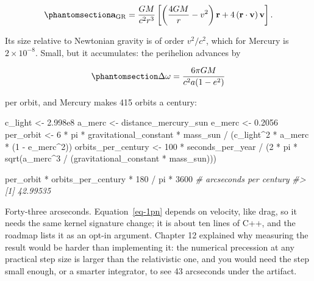 \documentclass[
  10.5pt,
  letterpaper,
]{scrbook}
\newenvironment{Shaded}{\begin{snugshade}}{\end{snugshade}}
\newcommand{\CommentTok}[1]{\textcolor[rgb]{0.00,0.00,0.00}{\textit{#1}}}
\newcommand{\DecValTok}[1]{\textcolor[rgb]{0.00,0.00,0.00}{#1}}
\newcommand{\FloatTok}[1]{\textcolor[rgb]{0.00,0.00,0.00}{#1}}
\newcommand{\FunctionTok}[1]{\textcolor[rgb]{0.00,0.00,0.00}{#1}}
\newcommand{\NormalTok}[1]{\textcolor[rgb]{0.00,0.00,0.00}{#1}}
\newcommand{\OtherTok}[1]{\textcolor[rgb]{0.00,0.00,0.00}{#1}}
\newcommand{\SpecialCharTok}[1]{\textcolor[rgb]{0.00,0.00,0.00}{#1}}
\theoremstyle{plain}
\theoremstyle{remark}
\begin{document}
\begin{equation}\protect\phantomsection\label{eq-1pn}{
\mathbf{a}_{\mathrm{GR}} = \frac{GM}{c^2 r^3}\left[\left(\frac{4GM}{r} - v^2\right)\mathbf{r} + 4\,(\mathbf{r}\cdot\mathbf{v})\,\mathbf{v}\right].
}\end{equation}

Its size relative to Newtonian gravity is of order \(v^2/c^2\), which
for Mercury is \(2\times10^{-8}\). Small, but it accumulates: the
perihelion advances by

\begin{equation}\protect\phantomsection\label{eq-gr-precession}{
\Delta\omega = \frac{6\pi GM}{c^2 a(1-e^2)}
}\end{equation}

per orbit, and Mercury makes 415 orbits a century:

\begin{Shaded}
\begin{Highlighting}[]
\NormalTok{c\_light }\OtherTok{\textless{}{-}} \FloatTok{2.998e8}
\NormalTok{a\_merc  }\OtherTok{\textless{}{-}}\NormalTok{ distance\_mercury\_sun}
\NormalTok{e\_merc  }\OtherTok{\textless{}{-}} \FloatTok{0.2056}
\NormalTok{per\_orbit }\OtherTok{\textless{}{-}} \DecValTok{6} \SpecialCharTok{*}\NormalTok{ pi }\SpecialCharTok{*}\NormalTok{ gravitational\_constant }\SpecialCharTok{*}\NormalTok{ mass\_sun }\SpecialCharTok{/}\NormalTok{ (c\_light}\SpecialCharTok{\^{}}\DecValTok{2} \SpecialCharTok{*}\NormalTok{ a\_merc }\SpecialCharTok{*}\NormalTok{ (}\DecValTok{1} \SpecialCharTok{{-}}\NormalTok{ e\_merc}\SpecialCharTok{\^{}}\DecValTok{2}\NormalTok{))}
\NormalTok{orbits\_per\_century }\OtherTok{\textless{}{-}} \DecValTok{100} \SpecialCharTok{*}\NormalTok{ seconds\_per\_year }\SpecialCharTok{/}\NormalTok{ (}\DecValTok{2} \SpecialCharTok{*}\NormalTok{ pi }\SpecialCharTok{*} \FunctionTok{sqrt}\NormalTok{(a\_merc}\SpecialCharTok{\^{}}\DecValTok{3} \SpecialCharTok{/}\NormalTok{ (gravitational\_constant }\SpecialCharTok{*}\NormalTok{ mass\_sun)))}

\NormalTok{per\_orbit }\SpecialCharTok{*}\NormalTok{ orbits\_per\_century }\SpecialCharTok{*} \DecValTok{180} \SpecialCharTok{/}\NormalTok{ pi }\SpecialCharTok{*} \DecValTok{3600}      \CommentTok{\# arcseconds per century}
\CommentTok{\#\textgreater{} [1] 42.99535}
\end{Highlighting}
\end{Shaded}

Forty-three arcseconds. Equation~\ref{eq-1pn} depends on velocity, like
drag, so it needs the same kernel signature change; it is about ten
lines of C++, and the roadmap lists it as an opt-in argument. Chapter 12
explained why measuring the result would be harder than implementing it:
the numerical precession at any practical step size is larger than the
relativistic one, and you would need the step small enough, or a smarter
integrator, to see 43 arcseconds under the artifact.
\end{document}
